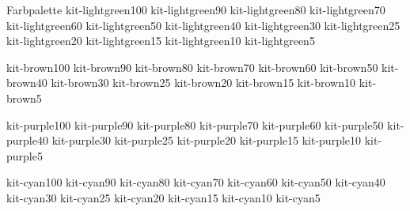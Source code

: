 \documentclass{sdqbeamer}
\begin{document}
\begin{frame}{Farbpalette}
  \colorbox{kit-lightgreen100}{kit-lightgreen100}
  \colorbox{kit-lightgreen90}{kit-lightgreen90}
  \colorbox{kit-lightgreen80}{kit-lightgreen80}
  \colorbox{kit-lightgreen70}{kit-lightgreen70}
  \colorbox{kit-lightgreen60}{kit-lightgreen60}
  \colorbox{kit-lightgreen50}{kit-lightgreen50}
  \colorbox{kit-lightgreen40}{kit-lightgreen40}
  \colorbox{kit-lightgreen30}{kit-lightgreen30}
  \colorbox{kit-lightgreen25}{kit-lightgreen25}
  \colorbox{kit-lightgreen20}{kit-lightgreen20}
  \colorbox{kit-lightgreen15}{kit-lightgreen15}
  \colorbox{kit-lightgreen10}{kit-lightgreen10}
  \colorbox{kit-lightgreen5}{kit-lightgreen5}

  \colorbox{kit-brown100}{kit-brown100}
  \colorbox{kit-brown90}{kit-brown90}
  \colorbox{kit-brown80}{kit-brown80}
  \colorbox{kit-brown70}{kit-brown70}
  \colorbox{kit-brown60}{kit-brown60}
  \colorbox{kit-brown50}{kit-brown50}
  \colorbox{kit-brown40}{kit-brown40}
  \colorbox{kit-brown30}{kit-brown30}
  \colorbox{kit-brown25}{kit-brown25}
  \colorbox{kit-brown20}{kit-brown20}
  \colorbox{kit-brown15}{kit-brown15}
  \colorbox{kit-brown10}{kit-brown10}
  \colorbox{kit-brown5}{kit-brown5}

  \colorbox{kit-purple100}{kit-purple100}
  \colorbox{kit-purple90}{kit-purple90}
  \colorbox{kit-purple80}{kit-purple80}
  \colorbox{kit-purple70}{kit-purple70}
  \colorbox{kit-purple60}{kit-purple60}
  \colorbox{kit-purple50}{kit-purple50}
  \colorbox{kit-purple40}{kit-purple40}
  \colorbox{kit-purple30}{kit-purple30}
  \colorbox{kit-purple25}{kit-purple25}
  \colorbox{kit-purple20}{kit-purple20}
  \colorbox{kit-purple15}{kit-purple15}
  \colorbox{kit-purple10}{kit-purple10}
  \colorbox{kit-purple5}{kit-purple5}

  \colorbox{kit-cyan100}{kit-cyan100}
  \colorbox{kit-cyan90}{kit-cyan90}
  \colorbox{kit-cyan80}{kit-cyan80}
  \colorbox{kit-cyan70}{kit-cyan70}
  \colorbox{kit-cyan60}{kit-cyan60}
  \colorbox{kit-cyan50}{kit-cyan50}
  \colorbox{kit-cyan40}{kit-cyan40}
  \colorbox{kit-cyan30}{kit-cyan30}
  \colorbox{kit-cyan25}{kit-cyan25}
  \colorbox{kit-cyan20}{kit-cyan20}
  \colorbox{kit-cyan15}{kit-cyan15}
  \colorbox{kit-cyan10}{kit-cyan10}
  \colorbox{kit-cyan5}{kit-cyan5}
    
\end{frame}
\backupend
\end{document}
